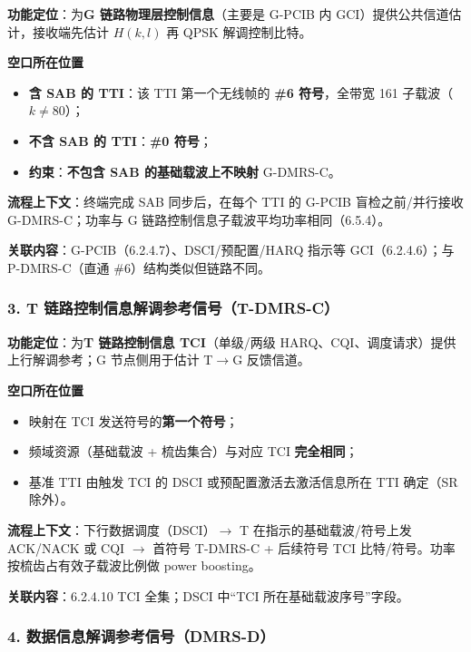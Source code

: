 \documentclass[11pt,a4paper]{ctexart}
\begin{document}
\textbf{功能定位}：为\textbf{G 链路物理层控制信息}（主要是 G-PCIB 内 GCI）提供公共信道估计，接收端先估计 $H(k,l)$ 再 QPSK 解调控制比特。

\textbf{空口所在位置}
\begin{itemize}[nosep]
  \item \textbf{含 SAB 的 TTI}：该 TTI 第一个无线帧的 \textbf{\#6 符号}，全带宽 161 子载波（$k{\neq}80$）；
  \item \textbf{不含 SAB 的 TTI}：\textbf{\#0 符号}；
  \item \textbf{约束}：\textbf{不包含 SAB 的基础载波上不映射} G-DMRS-C。
\end{itemize}

\textbf{流程上下文}：终端完成 SAB 同步后，在每个 TTI 的 G-PCIB 盲检之前/并行接收 G-DMRS-C；功率与 G 链路控制信息子载波平均功率相同（6.5.4）。

\textbf{关联内容}：G-PCIB（6.2.4.7）、DSCI/预配置/HARQ 指示等 GCI（6.2.4.6）；与 P-DMRS-C（直通 \#6）结构类似但链路不同。

\subsubsection{3. T 链路控制信息解调参考信号（T-DMRS-C）}

\textbf{功能定位}：为\textbf{T 链路控制信息 TCI}（单级/两级 HARQ、CQI、调度请求）提供上行解调参考；G 节点侧用于估计 T$\rightarrow$G 反馈信道。

\textbf{空口所在位置}
\begin{itemize}[nosep]
  \item 映射在 TCI 发送符号的\textbf{第一个符号}；
  \item 频域资源（基础载波 + 梳齿集合）与对应 TCI \textbf{完全相同}；
  \item 基准 TTI 由触发 TCI 的 DSCI 或预配置激活去激活信息所在 TTI 确定（SR 除外）。
\end{itemize}

\textbf{流程上下文}：下行数据调度（DSCI）$\rightarrow$ T 在指示的基础载波/符号上发 ACK/NACK 或 CQI $\rightarrow$ 首符号 T-DMRS-C + 后续符号 TCI 比特/符号。功率按梳齿占有效子载波比例做 power boosting。

\textbf{关联内容}：6.2.4.10 TCI 全集；DSCI 中``TCI 所在基础载波序号''字段。

\subsubsection{4. 数据信息解调参考信号（DMRS-D）}
\end{document}
